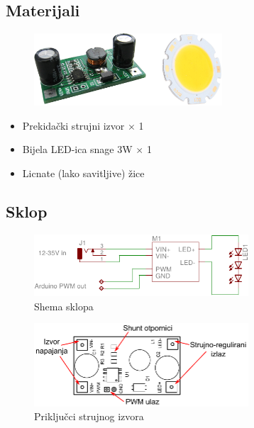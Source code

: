 \documentclass[times, utf8, zavrsni, numeric, sort]{fer}
\begin{document}
\subsection{Materijali}

\begin{figure}[h!]
	\centering
	\includegraphics[width=7cm]{./Fotke/1W LED/Materijal.jpg}
	\label{fig:slika1}
\end{figure}

\begin{itemize}
	\setlength{\itemsep}{0pt}
	\setlength{\parskip}{0pt}
	
	\item Prekidački strujni izvor $\times$ 1
	\item Bijela LED-ica snage 3W $\times$ 1
	\item Licnate (lako savitljive) žice
\end{itemize}

\subsection{Sklop}

\begin{figure}[htb]
	\centering
	\includegraphics[width=8cm]{./Sklopovi/1W LED/sklop.pdf}
	\caption{Shema sklopa}
	\label{fig:ledshema}
\end{figure}

\begin{figure}[htb]
	\centering
	\includegraphics[width=8cm]{./Sklopovi/1W LED/pinout.pdf}
	\caption{Priključci strujnog izvora}
	\label{fig:leddriverpinout}
\end{figure}
\end{document}
